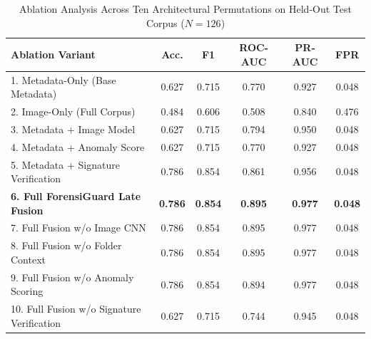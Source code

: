 \begin{table}[htbp]
\centering
\caption{Ablation Analysis Across Ten Architectural Permutations on Held-Out Test Corpus ($N=126$)}
\label{tab:ablation}
\begin{tabular}{|l|c|c|c|c|c|}
\hline
\textbf{Ablation Variant} & \textbf{Acc.} & \textbf{F1} & \textbf{ROC-AUC} & \textbf{PR-AUC} & \textbf{FPR} \\ \hline
1. Metadata-Only (Base Metadata) & 0.627 & 0.715 & 0.770 & 0.927 & 0.048 \\ \hline
2. Image-Only (Full Corpus) & 0.484 & 0.606 & 0.508 & 0.840 & 0.476 \\ \hline
3. Metadata + Image Model & 0.627 & 0.715 & 0.794 & 0.950 & 0.048 \\ \hline
4. Metadata + Anomaly Score & 0.627 & 0.715 & 0.770 & 0.927 & 0.048 \\ \hline
5. Metadata + Signature Verification & 0.786 & 0.854 & 0.861 & 0.956 & 0.048 \\ \hline
\textbf{6. Full ForensiGuard Late Fusion} & \textbf{0.786} & \textbf{0.854} & \textbf{0.895} & \textbf{0.977} & \textbf{0.048} \\ \hline
7. Full Fusion w/o Image CNN & 0.786 & 0.854 & 0.895 & 0.977 & 0.048 \\ \hline
8. Full Fusion w/o Folder Context & 0.786 & 0.854 & 0.895 & 0.977 & 0.048 \\ \hline
9. Full Fusion w/o Anomaly Scoring & 0.786 & 0.854 & 0.894 & 0.977 & 0.048 \\ \hline
10. Full Fusion w/o Signature Verification & 0.627 & 0.715 & 0.744 & 0.945 & 0.048 \\ \hline
\end{tabular}
\end{table}

